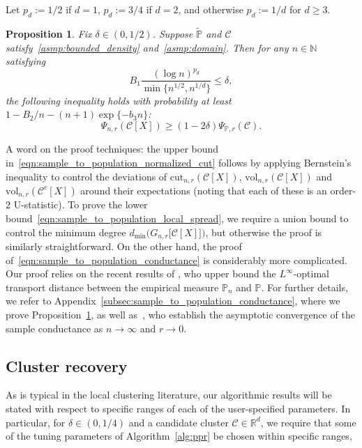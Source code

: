 \documentclass[11pt,twoside]{article}
\newtheorem{proposition}{Proposition}
\theoremstyle{definition}
\newcommand{\Reals}{\mathbb{R}}
\newcommand{\1}{\mathbf{1}}
\newcommand{\Rd}{\Reals^d}
\newcommand{\Leb}{L}
\newcommand{\mc}[1]{\mathcal{#1}}
\newcommand{\Pbb}{\mathbb{P}}
\newcommand{\wt}[1]{\widetilde{#1}}
\newcommand{\vol}{\mathrm{vol}}
\newcommand{\cut}{\mathrm{cut}}
\begin{document}
Let $p_d := 1/2$ if $d = 1$, $p_d := 3/4$ if $d = 2$, and otherwise $p_d := 1/d$ for $d \geq 3$. 
\begin{proposition}
	\label{prop:sample_to_population_2}
	Fix $\delta \in (0,1/2)$. Suppose  $\wt{\Pbb}$ and $\mc{C}$ satisfy~\ref{asmp:bounded_density} and~\ref{asmp:domain}. Then for any $n \in \mathbb{N}$ satisfying
	\begin{equation}
	\label{eqn:sample_to_population_conductance_sample_complexity}
	B_1 \frac{(\log n)^{p_d}}{\min\{n^{1/2},n^{1/d}\}} \leq \delta,
	\end{equation}
	the following inequality holds with probability at least $1 - B_2/n - (n + 1)\exp\{-b_3n\}$:
	\begin{equation}
	\label{eqn:sample_to_population_conductance}
	\Psi_{n,r}(\mc{C}[X]) \geq (1 - 2\delta) \Psi_{\Pbb,r}(\mc{C}).
	\end{equation}
\end{proposition}

A word on the proof techniques: the upper bound in~\eqref{eqn:sample_to_population_normalized_cut} follows by applying Bernstein's inequality to control the deviations of $\cut_{n,r}(\mc{C}[X])$, $\vol_{n,r}(\mc{C}[X])$ and $\vol_{n,r}(\mc{C}^c[X])$ around their expectations (noting that each of these is an order-$2$ U-statistic). To prove the lower bound~\eqref{eqn:sample_to_population_local_spread}, we require a union bound to control the minimum degree $d_{\min}\bigl(G_{n,r}\bigl[\mc{C}[X]\bigr]\bigr)$, but otherwise the proof is similarly straightforward. On the other hand, the proof of~\eqref{eqn:sample_to_population_conductance} is considerably more complicated. Our proof relies on the recent results of \citep{garciatrillos16b}, who upper bound the  $\Leb^{\infty}$-optimal transport distance between the empirical measure $\mathbb{P}_n$ and $\mathbb{P}$. For further details, we refer to Appendix~\ref{subsec:sample_to_population_conductance}, where we prove Proposition~\ref{prop:sample_to_population_2}, as well as~\citep{garciatrillos16}, who establish the asymptotic convergence of the sample conductance as $n \to \infty$ and $r \to 0$.

\subsection{Cluster recovery}
\label{subsec:cluster_recovery}
As is typical in the local clustering literature, our algorithmic results will be stated with respect to specific ranges of each of the user-specified
parameters. In particular, for $\delta \in (0,1/4)$ and a candidate cluster $\mc{C} \in \Rd$, we require that some of the tuning parameters of Algorithm~\ref{alg:ppr} be chosen within specific ranges, 
\end{document}
